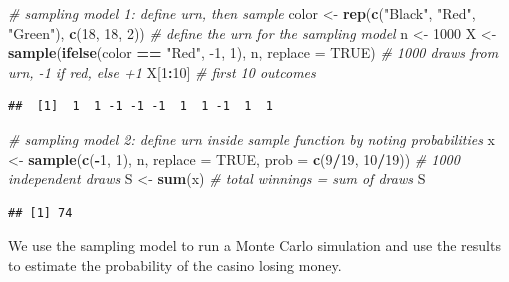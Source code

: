 \documentclass[
]{article}
\newenvironment{Shaded}{\begin{snugshade}}{\end{snugshade}}
\newcommand{\CommentTok}[1]{\textcolor[rgb]{0.56,0.35,0.01}{\textit{#1}}}
\newcommand{\DataTypeTok}[1]{\textcolor[rgb]{0.13,0.29,0.53}{#1}}
\newcommand{\DecValTok}[1]{\textcolor[rgb]{0.00,0.00,0.81}{#1}}
\newcommand{\KeywordTok}[1]{\textcolor[rgb]{0.13,0.29,0.53}{\textbf{#1}}}
\newcommand{\NormalTok}[1]{#1}
\newcommand{\OperatorTok}[1]{\textcolor[rgb]{0.81,0.36,0.00}{\textbf{#1}}}
\newcommand{\OtherTok}[1]{\textcolor[rgb]{0.56,0.35,0.01}{#1}}
\newcommand{\StringTok}[1]{\textcolor[rgb]{0.31,0.60,0.02}{#1}}
\begin{document}
\begin{Shaded}
\begin{Highlighting}[]
\CommentTok{\# sampling model 1: define urn, then sample}
\NormalTok{color \textless{}{-}}\StringTok{ }\KeywordTok{rep}\NormalTok{(}\KeywordTok{c}\NormalTok{(}\StringTok{"Black"}\NormalTok{, }\StringTok{"Red"}\NormalTok{, }\StringTok{"Green"}\NormalTok{), }\KeywordTok{c}\NormalTok{(}\DecValTok{18}\NormalTok{, }\DecValTok{18}\NormalTok{, }\DecValTok{2}\NormalTok{)) }\CommentTok{\# define the urn for the sampling model}
\NormalTok{n \textless{}{-}}\StringTok{ }\DecValTok{1000}
\NormalTok{X \textless{}{-}}\StringTok{ }\KeywordTok{sample}\NormalTok{(}\KeywordTok{ifelse}\NormalTok{(color }\OperatorTok{==}\StringTok{ "Red"}\NormalTok{, }\DecValTok{{-}1}\NormalTok{, }\DecValTok{1}\NormalTok{), n, }\DataTypeTok{replace =} \OtherTok{TRUE}\NormalTok{)    }\CommentTok{\# 1000 draws from urn, {-}1 if red, else +1}
\NormalTok{X[}\DecValTok{1}\OperatorTok{:}\DecValTok{10}\NormalTok{]    }\CommentTok{\# first 10 outcomes}
\end{Highlighting}
\end{Shaded}

\begin{verbatim}
##  [1]  1  1 -1 -1 -1  1  1 -1  1  1
\end{verbatim}

\begin{Shaded}
\begin{Highlighting}[]
\CommentTok{\# sampling model 2: define urn inside sample function by noting probabilities}
\NormalTok{x \textless{}{-}}\StringTok{ }\KeywordTok{sample}\NormalTok{(}\KeywordTok{c}\NormalTok{(}\OperatorTok{{-}}\DecValTok{1}\NormalTok{, }\DecValTok{1}\NormalTok{), n, }\DataTypeTok{replace =} \OtherTok{TRUE}\NormalTok{, }\DataTypeTok{prob =} \KeywordTok{c}\NormalTok{(}\DecValTok{9}\OperatorTok{/}\DecValTok{19}\NormalTok{, }\DecValTok{10}\OperatorTok{/}\DecValTok{19}\NormalTok{))    }\CommentTok{\# 1000 independent draws}
\NormalTok{S \textless{}{-}}\StringTok{ }\KeywordTok{sum}\NormalTok{(x)    }\CommentTok{\# total winnings = sum of draws}
\NormalTok{S}
\end{Highlighting}
\end{Shaded}

\begin{verbatim}
## [1] 74
\end{verbatim}

We use the sampling model to run a Monte Carlo simulation and use the
results to estimate the probability of the casino losing money.
\end{document}
